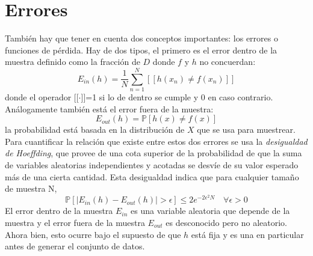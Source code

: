 \section{Errores}
También hay que tener en cuenta dos conceptos importantes: los errores o funciones de pérdida. Hay de dos tipos, el primero es el error dentro de la muestra definido como la fracción de $D$ donde $f$ y $h$ no concuerdan:
\[E_{in}(h) = \frac{1}{N}\sum_{n=1}^{N}[[h(x_{n}) \neq f(x_{n})]]\]
donde el operador [[$\cdot$]]=1 si lo de dentro se cumple y 0 en caso contrario. Análogamente también está el error fuera de la muestra:
\[ E_{out}(h)=\mathbb{P}[h(x) \neq f(x)] \]
la probabilidad está basada en la distribución de $X$ que se usa para muestrear.\\
Para cuantificar la relación que existe entre estos dos errores se usa la \textit{desigualdad de Hoeffding}, que provee de una cota superior de la probabilidad de que la suma de variables aleatorias independientes y acotadas se desvíe de su valor esperado más de una cierta cantidad. Esta desigualdad indica que para cualquier tamaño de muestra N,
\[ \mathbb{P}[\vert E_{in}(h)-E_{out}(h) \vert > \epsilon] \leq  2e^{-2\epsilon^{2}N} \quad \forall \epsilon > 0 \]
El error dentro de la muestra $E_{in}$ es una variable aleatoria que depende de la muestra y el error fuera de la muestra $E_{out}$ es desconocido pero no aleatorio. Ahora bien, esto ocurre bajo el supuesto de que $h$ está fija y es una en particular antes de generar el conjunto de datos. \cite{abu2012learning}
